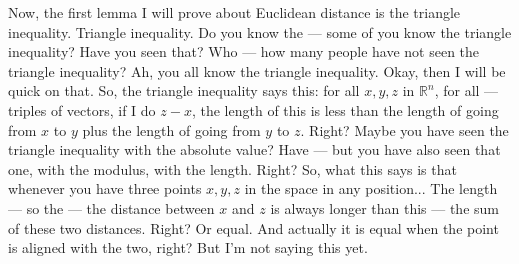 \begin{spoken-clean}[00:24:42 - 00:26:37]
Now, the first lemma I will prove about Euclidean distance is the triangle inequality. Triangle inequality. Do you know the --- some of you know the triangle inequality? Have you seen that? Who --- how many people have not seen the triangle inequality? Ah, you all know the triangle inequality. Okay, then I will be quick on that. So, the triangle inequality says this: for all $x, y, z$ in $\mathbb{R}^n$, for all --- triples of vectors, if I do $z - x$, the length of this is less than the length of going from $x$ to $y$ plus the length of going from $y$ to $z$. Right?  Maybe you have seen the triangle inequality with the absolute value? Have --- but you have also seen that one, with the modulus, with the length. Right? So, what this says is that whenever you have three points $x, y, z$ in the space in any position...  The length --- so the --- the distance between $x$ and $z$ is always longer than this --- the sum of these two distances. Right? Or equal. And actually it is equal when the point is aligned with the two, right? But I'm not saying this yet.
\end{spoken-clean}

